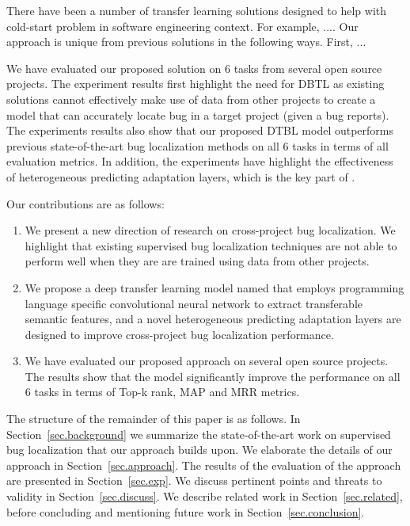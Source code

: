 There have been a number of transfer learning solutions designed to help with cold-start problem in software engineering context. For example, .... Our approach is unique from previous solutions in the following ways. First, ... 

We have evaluated our proposed solution on 6 tasks from several open source projects. The experiment results first highlight the need for DBTL as existing solutions cannot effectively make use of data from other projects to create a model that can accurately locate bug in a target project (given a bug reports). The experiments results also show that our proposed DTBL model \TRANPCNN outperforms previous state-of-the-art bug localization methods on all 6 tasks in terms of all evaluation metrics. In addition, the experiments have highlight the effectiveness of heterogeneous predicting adaptation layers, which is the key part of \TRANPCNN.

Our contributions are as follows:

\begin{enumerate}

\item We present a new direction of research on cross-project bug localization. We highlight that existing supervised bug localization techniques are not able to perform well when they are are trained using data from other projects. 
    
\item {} We propose a deep transfer learning model named \TRANPCNN that employs programming language specific convolutional neural network to extract transferable semantic features, and a novel heterogeneous predicting adaptation layers are designed to improve cross-project bug localization performance.  

\item {} We have evaluated our proposed approach on several open source projects. The results show that the \TRANPCNN model significantly improve the performance on all 6 tasks in terms of Top-k rank, MAP and MRR metrics. 


\end{enumerate}

The structure of the remainder of this paper is as follows. In Section~\ref{sec.background} we summarize the state-of-the-art work on supervised bug localization that our approach builds upon. We elaborate the details of our approach in Section~\ref{sec.approach}. The results of the evaluation of the approach are presented in Section~\ref{sec.exp}. We discuss pertinent points and threats to validity in Section~\ref{sec.discuss}. We describe related work in Section~\ref{sec.related}, before concluding and mentioning future work in Section~\ref{sec.conclusion}. 